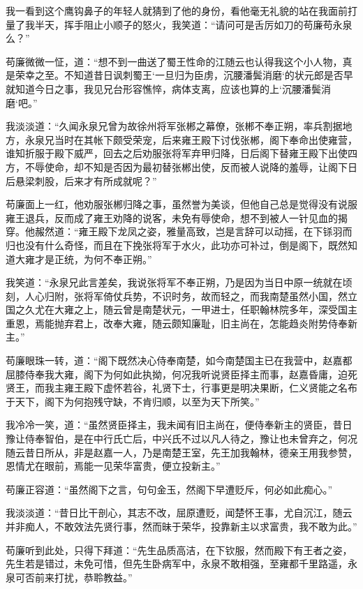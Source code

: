 我一看到这个鹰钩鼻子的年轻人就猜到了他的身份，看他毫无礼貌的站在我面前打量了我半天，挥手阻止小顺子的怒火，我笑道：“请问可是舌厉如刀的苟廉苟永泉么？”

苟廉微微一怔，道：“想不到一曲送了蜀王性命的江随云也认得我这个小人物，真是荣幸之至。不知道昔日讽刺蜀王‘一旦归为臣虏，沉腰潘鬓消磨‘的状元郎是否早就知道今日之事，我见兄台形容憔悴，病体支离，应该也算的上‘沉腰潘鬓消磨‘吧。”

我淡淡道：“久闻永泉兄曾为故徐州将军张郴之幕僚，张郴不奉正朔，率兵割据地方，永泉兄当时在其帐下颇受荣宠，后来雍王殿下讨伐张郴，阁下奉命出使雍营，谁知折服于殿下威严，回去之后劝服张将军弃甲归降，日后阁下替雍王殿下出使四方，不辱使命，却不知是否因为最初替张郴出使，反而被人说降的羞辱，让阁下日后悬梁刺股，后来才有所成就呢？”

苟廉面上一红，他劝服张郴归降之事，虽然誉为美谈，但他自己总是觉得没有说服雍王退兵，反而成了雍王劝降的说客，未免有辱使命，想不到被人一针见血的揭穿。他赧然道：“雍王殿下龙凤之姿，雅量高致，岂是言辞可以动摇，在下铩羽而归也没有什么奇怪，而且在下挽张将军于水火，此功亦可补过，倒是阁下，既然知道大雍才是正统，为何不奉正朔。”

我笑道：“永泉兄此言差矣，我说张将军不奉正朔，乃是因为当日中原一统就在顷刻，人心归附，张将军倚仗兵势，不识时务，故而轻之，而我南楚虽然小国，然立国之久尤在大雍之上，随云曾是南楚状元，一甲进士，任职翰林院多年，深受国主重恩，焉能抛弃君上，改奉大雍，随云颇知廉耻，旧主尚在，怎能趋炎附势侍奉新主。”

苟廉眼珠一转，道：“阁下既然决心侍奉南楚，如今南楚国主已在我营中，赵嘉都屈膝侍奉我大雍，阁下为何如此执拗，何况我听说贤臣择主而事，赵嘉昏庸，迫死贤王，而我主雍王殿下虚怀若谷，礼贤下士，行事更是明决果断，仁义贤能之名布于天下，阁下为何抱残守缺，不肯归顺，以至为天下所笑。”

我冷冷一笑，道：“虽然贤臣择主，我未闻有旧主尚在，便侍奉新主的贤臣，昔日豫让侍奉智伯，是在中行氏亡后，中兴氏不过以凡人待之，豫让也未曾弃之，何况随云昔日所从，非是赵嘉一人，乃是南楚王室，先王加我翰林，德亲王用我参赞，恩情尤在眼前，焉能一见荣华富贵，便立投新主。”

苟廉正容道：“虽然阁下之言，句句金玉，然阁下早遭贬斥，何必如此痴心。”

我淡淡道：“昔日比干剖心，其志不改，屈原遭贬，闻楚怀王事，尤自沉江，随云并非痴人，不敢效法先贤行事，然而昧于荣华，投靠新主以求富贵，我不敢为此。”

苟廉听到此处，只得下拜道：“先生品质高洁，在下钦服，然而殿下有王者之姿，先生若是错过，未免可惜，但先生卧病军中，永泉不敢相强，至雍都千里路遥，永泉可否前来打扰，恭聆教益。”

